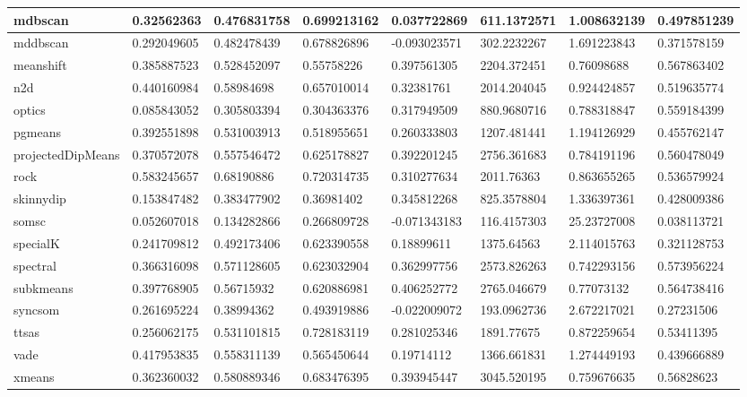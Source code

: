 \begin{table}[H]
\begin{tabular}{|l|l|l|l|l|l|l|l|}
\hline
mdbscan & 0.32562363 & 0.476831758 & 0.699213162 & 0.037722869 & 611.1372571 & 1.008632139 & 0.497851239 \\
\hline
mddbscan & 0.292049605 & 0.482478439 & 0.678826896 & -0.093023571 & 302.2232267 & 1.691223843 & 0.371578159 \\
\hline
meanshift & 0.385887523 & 0.528452097 & 0.55758226 & 0.397561305 & 2204.372451 & 0.76098688 & 0.567863402 \\
\hline
n2d & 0.440160984 & 0.58984698 & 0.657010014 & 0.32381761 & 2014.204045 & 0.924424857 & 0.519635774 \\
\hline
optics & 0.085843052 & 0.305803394 & 0.304363376 & 0.317949509 & 880.9680716 & 0.788318847 & 0.559184399 \\
\hline
pgmeans & 0.392551898 & 0.531003913 & 0.518955651 & 0.260333803 & 1207.481441 & 1.194126929 & 0.455762147 \\
\hline
projectedDipMeans & 0.370572078 & 0.557546472 & 0.625178827 & 0.392201245 & 2756.361683 & 0.784191196 & 0.560478049 \\
\hline
rock & 0.583245657 & 0.68190886 & 0.720314735 & 0.310277634 & 2011.76363 & 0.863655265 & 0.536579924 \\
\hline
skinnydip & 0.153847482 & 0.383477902 & 0.36981402 & 0.345812268 & 825.3578804 & 1.336397361 & 0.428009386 \\
\hline
somsc & 0.052607018 & 0.134282866 & 0.266809728 & -0.071343183 & 116.4157303 & 25.23727008 & 0.038113721 \\
\hline
specialK & 0.241709812 & 0.492173406 & 0.623390558 & 0.18899611 & 1375.64563 & 2.114015763 & 0.321128753 \\
\hline
spectral & 0.366316098 & 0.571128605 & 0.623032904 & 0.362997756 & 2573.826263 & 0.742293156 & 0.573956224 \\
\hline
subkmeans & 0.397768905 & 0.56715932 & 0.620886981 & 0.406252772 & 2765.046679 & 0.77073132 & 0.564738416 \\
\hline
syncsom & 0.261695224 & 0.38994362 & 0.493919886 & -0.022009072 & 193.0962736 & 2.672217021 & 0.27231506 \\
\hline
ttsas & 0.256062175 & 0.531101815 & 0.728183119 & 0.281025346 & 1891.77675 & 0.872259654 & 0.53411395 \\
\hline
vade & 0.417953835 & 0.558311139 & 0.565450644 & 0.19714112 & 1366.661831 & 1.274449193 & 0.439666889 \\
\hline
xmeans & 0.362360032 & 0.580889346 & 0.683476395 & 0.393945447 & 3045.520195 & 0.759676635 & 0.56828623 \\
\hline
\end{tabular}
\end{table}